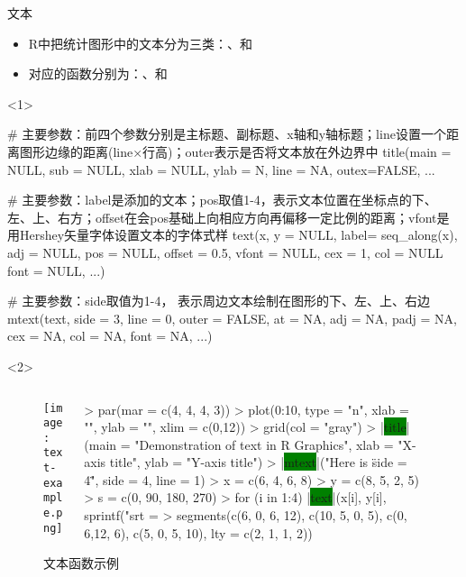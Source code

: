 \begin{frame}[t,fragile]{\subsecname}{文本}
\begin{itemize}
\item R中把统计图形中的文本分为三类：、和
\item 对应的函数分别为：、和
\end{itemize}

\begin{onlyenv}<1>
\begin{rcode}
# 主要参数：前四个参数分别是主标题、副标题、x轴和y轴标题；line设置一个距离图形边缘的距离(line×行高)；outer表示是否将文本放在外边界中
title(main = NULL, sub = NULL, xlab = NULL, ylab = N, line = NA, outex=FALSE, ...

# 主要参数：label是添加的文本；pos取值1-4，表示文本位置在坐标点的下、左、上、右方；offset在会pos基础上向相应方向再偏移一定比例的距离；vfont是用Hershey矢量字体设置文本的字体式样
text(x, y = NULL, label= seq_along(x), adj = NULL, pos = NULL, offset = 0.5, vfont = NULL, cex = 1, col = NULL font = NULL, ...)

# 主要参数：side取值为1-4， 表示周边文本绘制在图形的下、左、上、右边
mtext(text, side = 3, line = 0, outer = FALSE, at = NA, adj = NA, padj = NA, cex = NA, col = NA, font = NA, ...)
\end{rcode}
\end{onlyenv}  

\begin{onlyenv}<2>
\begin{figure}
 \begin{columns}
    \begin{column}[c]{.4\textwidth}
        \texttt{[image: text-example.png]}
    \end{column}

    \begin{column}[c]{.6\textwidth}
\begin{rcode}
> par(mar = c(4, 4, 4, 3))
> plot(0:10, type = "n", xlab = "", ylab = "", xlim = c(0,12))
> grid(col = "gray")
> |\colorbox{green}{title}|(main = "Demonstration of text in R Graphics", xlab = "X-axis title", ylab = "Y-axis title")
> |\colorbox{green}{mtext}|("Here is \"side = 4\"", side = 4, line = 1)
> x = c(6, 4, 6, 8)
> y = c(8, 5, 2, 5)
> s = c(0, 90, 180, 270)
> for (i in 1:4) |\colorbox{green}{text}|(x[i], y[i], sprintf("srt = %
> segments(c(6, 0, 6, 12), c(10, 5, 0, 5), c(0, 6,12, 6), c(5, 0, 5, 10), lty = c(2, 1, 1, 2))
\end{rcode}
    \end{column}
  \end{columns}
  \caption{文本函数示例}
\end{figure}
\end{onlyenv}
\end{frame}

